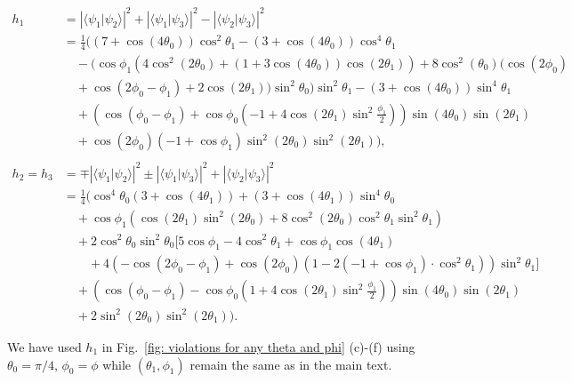 \documentclass[letterpaper,onecolumn,12pt,accepted=2024-01-17]{article}
\begin{document}
\begin{align*}
    h_1 & = |\langle \psi_1\vert \psi_2\rangle |^2 +|\langle \psi_1\vert \psi_3\rangle |^2- |\langle \psi_2 \vert \psi_3 \rangle |^2 \\
    & = \frac{1}{4}((7 + \cos(4\theta_0)) \cos^2\theta_1 - (3 +\cos(4\theta_0))\cos^4\theta_1 \\
    & \quad - (\cos\phi_1 (4 \cos^2(2\theta_0) + (1 + 3 \cos(4\theta_0)) \cos(2\theta_1)) +8 \cos^2(\theta_0) (\cos(2\phi_0)\\
    &\quad + \cos(2\phi_0 - \phi_1) +2\cos(2\theta_1))\sin^2\theta_0) \sin^2\theta_1 - (3 + \cos(4\theta_0)) \sin^4\theta_1 \\
    &\quad + (\cos(\phi_0 - \phi_1) +\cos\phi_0 (-1 + 4\cos(2 \theta_1) \sin^2\frac{\phi_1}{2})) \sin(4\theta_0) \sin(2\theta_1)\\
    &\quad +\cos(2\phi_0) (-1 + \cos\phi_1) \sin^2(2\theta_0) \sin^2(2\theta_1)),\\
    \\
    h_2 = h_3 & = \mp |\langle \psi_1 \vert \psi_2 \rangle |^2 \pm |\langle \psi_1 \vert \psi_3 \rangle |^2+
    |\langle \psi_2 \vert \psi_3 \rangle |^2 \\
    &=\frac{1}{4}(\cos^4\theta_0 (3 + \cos(4\theta_1)) + (3 + \cos(4\theta_1)) \sin^4\theta_0\\ 
    &\quad + \cos\phi_1 (\cos(2\theta_1) \sin^2(2\theta_0) + 8\cos^2(2\theta_0) \cos^2\theta_1 \sin^2\theta_1)\\
    &\quad +2 \cos^2\theta_0 \sin^2\theta_0 \bigl[5 \cos\phi_1 - 4 \cos^2\theta_1 + \cos\phi_1 \cos(4\theta_1)\\
    &\quad \quad + 4 (-\cos(2 \phi_0 - \phi_1) +\cos(2 \phi_0) (1 - 2 (-1 + \cos\phi_1)\cdot \cos^2\theta_1)) \sin^2\theta_1\bigr]\\
    &\quad +(\cos(\phi_0 - \phi_1) - \cos\phi_0 (1 + 4 \cos(2\theta_1) \sin^2\frac{\phi_1}{2})) \sin(4\theta_0) \sin(2\theta_1)\\
    &\quad +  2\sin^2(2\theta_0)\sin^2(2\theta_1)).
\end{align*}

We have used $h_1$ in Fig.~\ref{fig: violations for any theta and phi} (c)-(f) using $\theta_0 = \pi/4$, $\phi_0 = \phi$ while $(\theta_1,\phi_1)$ remain the same as in the main text. 
\end{document}

